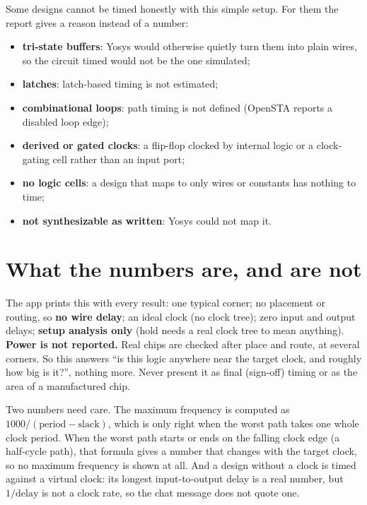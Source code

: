 Some designs cannot be timed honestly with this simple setup. For them the report gives a reason instead of a number:
\begin{itemize}
  \item \textbf{tri-state buffers}: Yosys would otherwise quietly turn them into plain wires, so the circuit timed would not be the one simulated;
  \item \textbf{latches}: latch-based timing is not estimated;
  \item \textbf{combinational loops}: path timing is not defined (OpenSTA reports a disabled loop edge);
  \item \textbf{derived or gated clocks}: a flip-flop clocked by internal logic or a clock-gating cell rather than an input port;
  \item \textbf{no logic cells}: a design that maps to only wires or constants has nothing to time;
  \item \textbf{not synthesizable as written}: Yosys could not map it.
\end{itemize}

\section{What the numbers are, and are not}

\begin{warnbox}
The app prints this with every result: one typical corner; no placement or routing, so \textbf{no wire delay}; an ideal clock (no clock tree); zero input and output delays; \textbf{setup analysis only} (hold needs a real clock tree to mean anything). \textbf{Power is not reported.} Real chips are checked after place and route, at several corners. So this answers ``is this logic anywhere near the target clock, and roughly how big is it?'', nothing more. Never present it as final (sign-off) timing or as the area of a manufactured chip.
\end{warnbox}

Two numbers need care. The maximum frequency is computed as $1000 / (\text{period} - \text{slack})$, which is only right when the worst path takes one whole clock period. When the worst path starts or ends on the falling clock edge (a half-cycle path), that formula gives a number that changes with the target clock, so no maximum frequency is shown at all. And a design without a clock is timed against a virtual clock: its longest input-to-output delay is a real number, but $1/\text{delay}$ is not a clock rate, so the chat message does not quote one.

